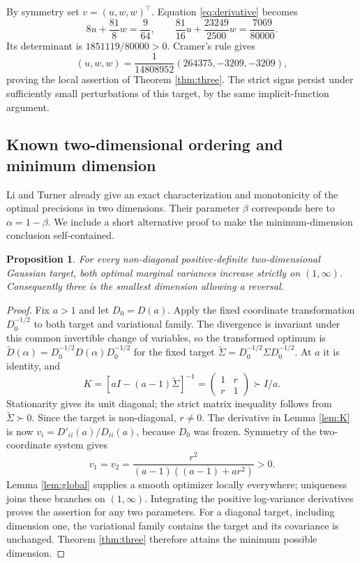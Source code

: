 \documentclass[11pt]{article}
\newtheorem{proposition}[theorem]{Proposition}
\theoremstyle{remark}\newtheorem{remark}[theorem]{Remark}
\begin{document}
By symmetry set $v=(u,w,w)^\top$. Equation \eqref{eq:derivative}
becomes
\[
 8u+\frac{81}{8}w=\frac9{64},\qquad
 \frac{81}{16}u+\frac{23249}{2500}w=\frac{7069}{80000}.
\]
Its determinant is $1851119/80000>0$. Cramer's rule gives
\[
 (u,w,w)=\frac1{14808952}(264375,-3209,-3209),
\]
proving the local assertion of Theorem \ref{thm:three}.
The strict signs persist under sufficiently small perturbations of
this target, by the same implicit-function argument.

\subsection{Known two-dimensional ordering and minimum dimension}
Li and Turner \cite[Appendix B]{li-turner} already give an exact
characterization and monotonicity of the optimal precisions in two
dimensions. Their parameter $\beta$ corresponds here to
$\alpha=1-\beta$. We include a short alternative proof to make the
minimum-dimension conclusion self-contained.
\begin{proposition}\label{prop:two}
For every non-diagonal positive-definite two-dimensional Gaussian target,
both optimal marginal variances increase strictly on $(1,\infty)$.
Consequently three is the smallest dimension allowing a reversal.
\end{proposition}
\begin{proof}
Fix $a>1$ and let $D_0=D(a)$. Apply the fixed coordinate transformation
$D_0^{-1/2}$ to both target and variational family. The divergence is
invariant under this common invertible change of variables, so the
transformed optimum is
$\widetilde D(\alpha)=D_0^{-1/2}D(\alpha)D_0^{-1/2}$ for the fixed
target $\widetilde\Sigma=D_0^{-1/2}\Sigma D_0^{-1/2}$.
At $a$ it is identity, and
\[
 K=[aI-(a-1)\widetilde\Sigma]^{-1}
   =\begin{pmatrix}1&r\\r&1\end{pmatrix}\succ I/a.
\]
Stationarity gives its unit diagonal; the strict matrix inequality follows
from $\widetilde\Sigma\succ0$. Since the target is non-diagonal, $r\ne0$.
The derivative in Lemma \ref{lem:K} is now
$v_i=D'_{ii}(a)/D_{ii}(a)$, because $D_0$ was frozen. Symmetry of the
two-coordinate system gives
\[
 v_1=v_2=\frac{r^2}{(a-1)((a-1)+ar^2)}>0.
\]
Lemma \ref{lem:global} supplies a smooth optimizer locally everywhere;
uniqueness joins these branches on $(1,\infty)$. Integrating the positive
log-variance derivatives proves the assertion for any two parameters.
For a diagonal target, including dimension one, the variational family
contains the target and its covariance is unchanged. Theorem
\ref{thm:three} therefore attains the minimum possible dimension.
\end{proof}
\end{document}
